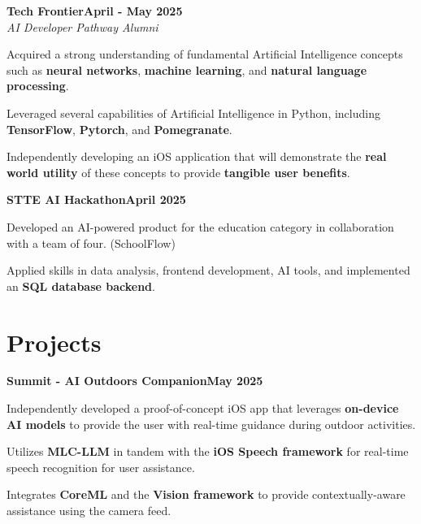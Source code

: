 \documentclass[letterpaper,10pt]{article}
\newcommand{\heading}[2]{
  \hspace{10pt}#1\hfill#2\\
}
\newcommand{\headingBf}[2]{
  \heading{\textbf{#1}}{\textbf{#2}}
}
\newcommand{\headingIt}[2]{
  \heading{\textit{#1}}{\textit{#2}}
}
\newenvironment{resume_list}{
  \vspace{-7pt}
  \begin{itemize}[itemsep=-2px, parsep=1pt, leftmargin=30pt]
}{
  \end{itemize}
}
\begin{document}
\headingBf{\large{Tech Frontier}}{April - May 2025}
\headingIt{AI Developer Pathway Alumni}{}
\begin{resume_list}
  \item Acquired a strong understanding of fundamental Artificial Intelligence concepts such as \textbf{neural networks}, \textbf{machine learning}, and \textbf{natural language processing}.
  \vspace{1pt}
  \item Leveraged several capabilities of Artificial Intelligence in Python, including \textbf{TensorFlow}, \textbf{Pytorch}, and \textbf{Pomegranate}.
  \vspace{1pt}
  \item Independently developing an iOS application that will demonstrate the \textbf{real world utility} of these concepts to provide \textbf{tangible user benefits}.
  \vspace{2pt}
\end{resume_list}

\headingBf{\large{STTE AI Hackathon}}{April 2025}
\begin{resume_list}
  \item Developed an AI-powered product for the education category in collaboration with a team of four. (SchoolFlow)
  \vspace{1pt}
  \item Applied skills in data analysis, frontend development, AI tools, and implemented an \textbf{SQL database backend}.
  \vspace{-2pt}
\end{resume_list}


\vspace{0pt}
\section{\large{Projects}}

\vspace{1pt}
\headingBf{\large{Summit - AI Outdoors Companion}}{May 2025}
\begin{resume_list}
  \vspace{1pt}
    \item Independently developed a proof-of-concept iOS app that leverages \textbf{on-device AI models} to provide the user with real-time guidance during outdoor activities.
    \vspace{1pt}
    \item Utilizes \textbf{MLC-LLM} in tandem with the \textbf{iOS Speech framework} for real-time speech recognition for user assistance.
    \vspace{1pt}
    \item Integrates \textbf{CoreML} and the \textbf{Vision framework} to provide contextually-aware assistance using the camera feed.
\end{resume_list}
\end{document}
